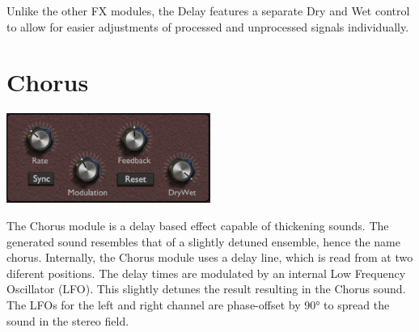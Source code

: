 
Unlike the other FX modules, the Delay features a separate Dry and Wet control to allow for easier adjustments of processed and unprocessed signals individually.


\section{Chorus}
\begin{center}
    \includegraphics[width=0.5\textwidth]{graphics/chorus.png}
\end{center}

The Chorus module is a delay based effect capable of thickening sounds. The generated sound resembles that of a slightly detuned ensemble, hence the name chorus. Internally, the Chorus module uses a delay line, which is read from at two diferent positions. The delay times are modulated by an internal Low Frequency Oscillator (LFO). This slightly detunes the result resulting in the Chorus sound. The LFOs for the left and right channel are phase-offset by 90° to spread the sound in the stereo field.


